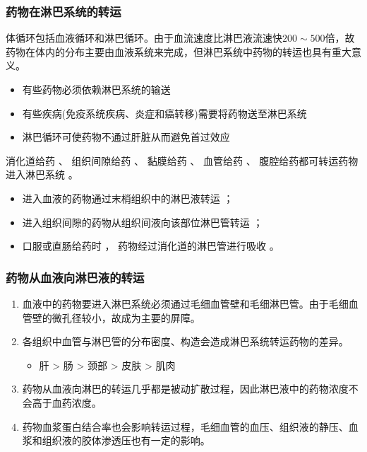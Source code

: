 \documentclass[dvipsnames, svgnames, x11names]{beamer}
\begin{document}
\begin{frame}
    \frametitle{药物在淋巴系统的转运}
    体循环包括血液循环和淋巴循环。由于血流速度比淋巴液流速快$200\sim 500$倍，故药物在体内的分布主要由血液系统来完成，但淋巴系统中药物的转运也具有重大意义。
    \begin{itemize}
      \item 有些药物必须依赖淋巴系统的输送
      \item 有些疾病(免疫系统疾病、炎症和癌转移)需要将药物送至淋巴系统
      \item 淋巴循环可使药物不通过肝脏从而避免首过效应
    \end{itemize}

    消化道给药 、 组织间隙给药 、 黏膜给药 、 血管给药 、 腹腔给药都可转运药物进入淋巴系统 。
    \begin{itemize}
      \item 进入血液的药物通过末梢组织中的淋巴液转运 ；
      \item 进入组织间隙的药物从组织间液向该部位淋巴管转运 ； 
      \item 口服或直肠给药时 ， 药物经过消化道的淋巴管进行吸收 。
    \end{itemize}
     
\end{frame}


\begin{frame}
    \frametitle{药物从血液向淋巴液的转运}
    \begin{enumerate}
      \item 血液中的药物要进入淋巴系统必须通过毛细血管壁和毛细淋巴管。由于毛细血管壁的微孔径较小，故成为主要的屏障。
      \item 各组织中血管与淋巴管的分布密度、构造会造成淋巴系统转运药物的差异。
        \begin{itemize}
            \item 肝 > 肠 > 颈部 > 皮肤 > 肌肉
        \end{itemize}
      \item 药物从血液向淋巴的转运几乎都是被动扩散过程，因此淋巴液中的药物浓度不会高于血药浓度。
      \item 药物血浆蛋白结合率也会影响转运过程，毛细血管的血压、组织液的静压、血浆和组织液的胶体渗透压也有一定的影响。
    \end{enumerate}
\end{frame}
\end{document}
